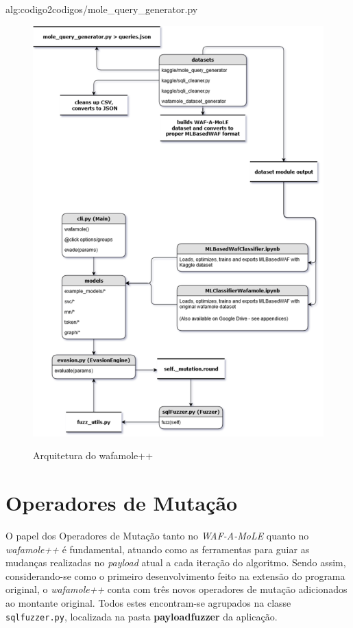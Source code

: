 \label{sec:codigos}
 {alg:codigo2}{codigos/mole_query_generator.py}
\bigskip

\begin{figure}[H]
    \centering
    \caption{Arquitetura do wafamole++}
    \includegraphics[width=16cm]{figuras/wafamole++_architecture.png} 
    \label{fig:internet} 
\end{figure}

\section{Operadores de Mutação}

O papel dos Operadores de Mutação tanto no \textit{WAF-A-MoLE} quanto no \textit{wafamole++} é fundamental, atuando como as ferramentas para guiar as mudanças realizadas no \textit{payload} atual a cada iteração do algoritmo. Sendo assim, considerando-se como o primeiro desenvolvimento feito na extensão do programa original, o \textit{wafamole++} conta com três novos operadores de mutação adicionados ao montante original. Todos estes encontram-se agrupados na classe \verb+sqlfuzzer.py+, localizada na pasta \textbf{payloadfuzzer} da aplicação.

